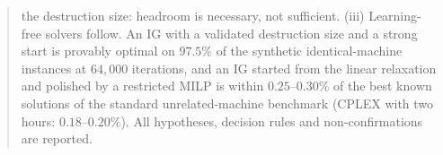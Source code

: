 \begin{abstract}
the destruction size: headroom is necessary, not sufficient. (iii) Learning-free solvers follow. An IG with a validated destruction size and a strong start is provably optimal on $97.5\%$ of the
synthetic identical-machine instances at $64{,}000$ iterations, and an IG started from the linear relaxation and polished by a restricted MILP is within $0.25$--$0.30\%$ of the best known solutions of the
standard unrelated-machine benchmark (CPLEX with two hours: $0.18$--$0.20\%$). All hypotheses, decision rules and non-confirmations are reported.
\end{abstract}
